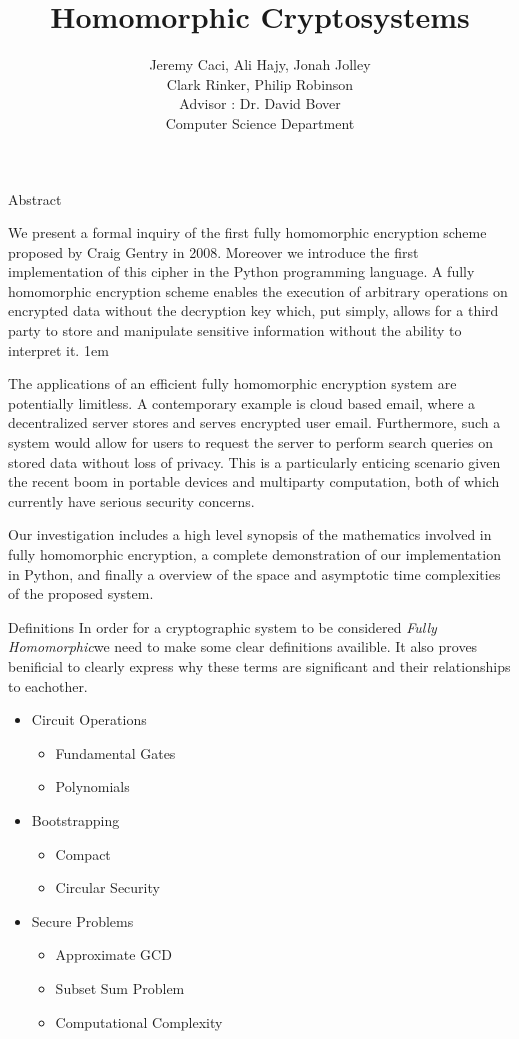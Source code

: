 \documentclass[a0,portrait]{a0poster}
\title{Homomorphic Cryptosystems}
\author{
Jeremy Caci, Ali Hajy, Jonah Jolley\\
Clark Rinker, Philip Robinson\\
Advisor : Dr. David Bover\\
Computer Science Department
}
\begin{document}
\maketitle

\def\fh{{\em Fully Homomorphic\xspace}}

\begin{multicols}{2}
\begin{slide}{Abstract}

We present a formal inquiry of the first fully homomorphic encryption scheme proposed by Craig Gentry in 2008. Moreover we introduce the first implementation of this cipher in the Python programming language. A fully homomorphic encryption scheme enables the execution of arbitrary operations on encrypted data without the decryption key which, put simply, allows for a third party to  store and manipulate sensitive information without the ability to interpret it. 
\parskip 1em

The applications of an efficient fully homomorphic encryption system are potentially limitless. A contemporary example is cloud based email, where a decentralized server stores and serves encrypted user email. Furthermore, such a system would allow for users to request the server to perform search queries on stored data without loss of privacy. This is a particularly enticing scenario given the recent boom in portable devices and multiparty computation, both of which currently have serious security concerns. 

Our investigation includes a high level synopsis of the mathematics involved in fully homomorphic encryption, a complete demonstration of our implementation in Python, and finally a overview of the space and asymptotic time complexities of the proposed system. 

\end{slide}

\begin{slide}{Definitions}
In order for a cryptographic system to be considered \fh we need to make some clear definitions availible. It also proves benificial to clearly express why these terms are significant and their relationships to eachother. 

\begin{itemize}
\item Circuit Operations
\begin{itemize}
\item Fundamental Gates
\item Polynomials
\end{itemize}
\item Bootstrapping
\begin{itemize}
\item Compact
\item Circular Security
\end{itemize}
\item Secure Problems
\begin{itemize}
\item Approximate GCD
\item Subset Sum Problem
\item Computational Complexity
\end{itemize}


\end{itemize}
\end{slide}
\end{multicols}
\end{document}
